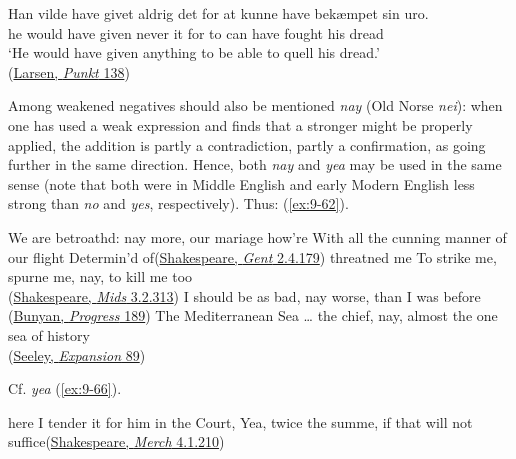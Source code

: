 \ea \label{ex:9-61}
  \gll Han vilde have givet aldrig det for at kunne have bekæmpet sin uro.\\
 he would have given never it for to can have fought his dread\\
 \glt `He would have given anything to be able to quell his dread.'\\\hfill(\href{https://tekster.kb.dk/text/adl-texts-larsenk_08-root#s139}{Larsen, \textit{Punkt} 138})
\z

\label{ch10-nay}Among weakened negatives should also be mentioned \textit{nay} (Old Norse \textit{nei}): when one has used a weak expression and finds that a stronger might be properly applied, the addition is partly a contradiction, partly a confirmation, as going further in the same direction. Hence, both \textit{nay} and \textit{yea} may be used in the same sense (note that both were in Middle English and early Modern English less strong than \textit{no} and \textit{yes}, respectively). Thus: (\ref{ex:9-62}).

\ea \label{ex:9-62}
\ea We are betroathd: nay more, our mariage how're With all the cunning manner of our flight Determin'd of\hfill(\href{https://internetshakespeare.uvic.ca/doc/TGV_F1/scene/2.4/index.html#tln-830}{Shakespeare, \textit{Gent} 2.4.179}) %
\ex threatned me To strike me, spurne me, nay, to kill me too\\\hfill(\href{https://internetshakespeare.uvic.ca/doc/MND_F1/scene/3.2/index.html#tln-1345}{Shakespeare, \textit{Mids} 3.2.313})
\ex I should be as bad, nay worse, than I was before\\\hfill(\href{https://archive.org/details/bunyanspilgrims00moffgoog/page/180/mode/2up?q=%22should+be+as+bad%22&view=theater}{Bunyan, \textit{Progress} 189})
\ex The Mediterranean Sea {\dots} the chief, nay, almost the one sea of history\\\hfill(\href{https://archive.org/details/ourcolonialexpan00seel/page/50/mode/2up?q=%22the+chief%2C+nay%22&view=theater}{Seeley, \textit{Expansion} 89})
\z
\z

Cf. \textit{yea} (\ref{ex:9-66}).

\ea \label{ex:9-66}
here I tender it for him in the Court, Yea, twice the summe, if that will not suffice\hfill(\href{https://internetshakespeare.uvic.ca/doc/MV_F1/scene/4.1/index.html#tln-2120}{Shakespeare, \textit{Merch} 4.1.210})
\z

